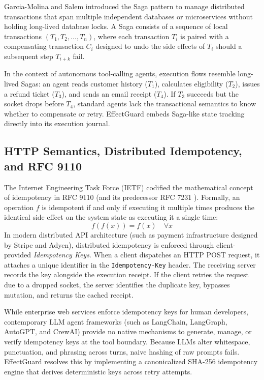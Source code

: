 Garcia-Molina and Salem \cite{garciamolina1987sagas} introduced the Saga pattern to manage distributed transactions that span multiple independent databases or microservices without holding long-lived database locks. A Saga consists of a sequence of local transactions $(T_1, T_2, \dots, T_n)$, where each transaction $T_i$ is paired with a compensating transaction $C_i$ designed to undo the side effects of $T_i$ should a subsequent step $T_{i+k}$ fail.

In the context of autonomous tool-calling agents, execution flows resemble long-lived Sagas: an agent reads customer history ($T_1$), calculates eligibility ($T_2$), issues a refund ticket ($T_3$), and sends an email receipt ($T_4$). If $T_3$ succeeds but the socket drops before $T_4$, standard agents lack the transactional semantics to know whether to compensate or retry. EffectGuard embeds Saga-like state tracking directly into its execution journal.

\subsection{HTTP Semantics, Distributed Idempotency, and RFC 9110}

The Internet Engineering Task Force (IETF) codified the mathematical concept of idempotency in RFC 9110 \cite{rfc9110} (and its predecessor RFC 7231 \cite{rfc7231}). Formally, an operation $f$ is idempotent if and only if executing it multiple times produces the identical side effect on the system state as executing it a single time:
\begin{equation}
    f(f(x)) = f(x) \quad \forall x
\end{equation}
In modern distributed API architecture (such as payment infrastructure designed by Stripe and Adyen), distributed idempotency is enforced through client-provided \textit{Idempotency Keys}. When a client dispatches an HTTP POST request, it attaches a unique identifier in the \texttt{Idempotency-Key} header. The receiving server records the key alongside the execution receipt. If the client retries the request due to a dropped socket, the server identifies the duplicate key, bypasses mutation, and returns the cached receipt.

While enterprise web services enforce idempotency keys for human developers, contemporary LLM agent frameworks (such as LangChain, LangGraph, AutoGPT, and CrewAI) provide no native mechanisms to generate, manage, or verify idempotency keys at the tool boundary. Because LLMs alter whitespace, punctuation, and phrasing across turns, naive hashing of raw prompts fails. EffectGuard resolves this by implementing a canonicalized SHA-256 idempotency engine that derives deterministic keys across retry attempts.

